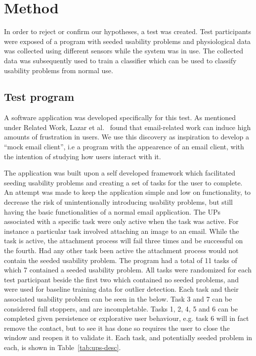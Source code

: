 

\section{Method}
In order to reject or confirm our hypotheses, a test was created.
Test participants were exposed of a program with seeded usability problems and physiological data was collected using different sensors while the system was in use. 
The collected data was subsequently used to train a classifier which can be used to classify usability problems from normal use.

\subsection{Test program}
A software application was developed specifically for this test. 
As mentioned under Related Work, Lazar et al.~\cite{frustration_with_computers} found that email-related work can induce
high amounts of frustration in users. We use this discovery as inspiration to develop a ``mock email client'', i.e a program
with the appearence of an email client, with the intention of studying how users interact with it.

The application was built upon a self developed framework which facilitated seeding usability problems and creating a set of tasks for the user to complete. 
An attempt was made to keep the application simple and low on functionality, to decrease the risk of unintentionally introducing usability problems, but still having the basic functionalities of a normal email application.  
The UPs associated with a specific task were only active when the task was active. 
For instance a particular task involved attaching an image to an email. 
While the task is active, the attachment process will fail three times and be successful on the fourth. 
Had any other task been active the attachment process would not contain the seeded usability problem.
The program had a total of 11 tasks of which 7 contained a seeded usability problem. 
All tasks were randomized for each test participant beside the first two which contained no seeded problems, and were used for baseline training data for outlier detection. 
Each task and their associated usability problem can be seen in the below. 
Task 3 and 7 can be considered full stoppers, and are incompletable. 
Tasks 1, 2, 4, 5 and 6 can be completed given persistence or explorative user behaviour, e.g. task 6 will in fact remove the contact, but to see it has done so requires the user to close the window and reopen it to validate it.
Each task, and potentially seeded problem in each, is shown in Table~\ref{tab:ups-desc}.

